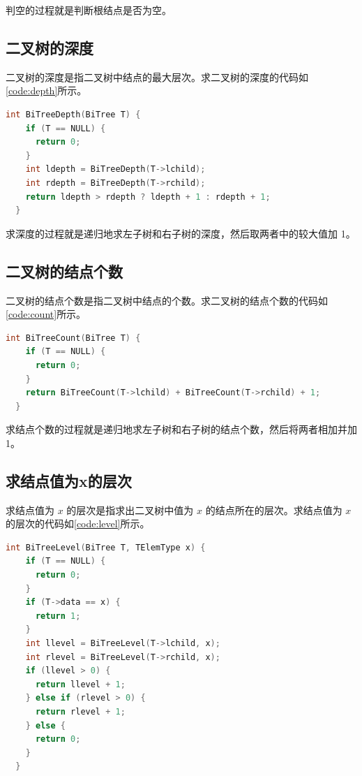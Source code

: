\documentclass[lang=cn,newtx,10pt,scheme=chinese]{../elegantbook}
\begin{document}
判空的过程就是判断根结点是否为空。

\subsection{二叉树的深度}

二叉树的深度是指二叉树中结点的最大层次。求二叉树的深度的代码如\ref{code:depth}所示。

\begin{lstlisting}[language=C++, caption={求深度}, label={code:depth}]
  int BiTreeDepth(BiTree T) {
    if (T == NULL) {
      return 0;
    }
    int ldepth = BiTreeDepth(T->lchild);
    int rdepth = BiTreeDepth(T->rchild);
    return ldepth > rdepth ? ldepth + 1 : rdepth + 1;
  }

\end{lstlisting}

求深度的过程就是递归地求左子树和右子树的深度，然后取两者中的较大值加 1。

\subsection{二叉树的结点个数}

二叉树的结点个数是指二叉树中结点的个数。求二叉树的结点个数的代码如\ref{code:count}所示。

\begin{lstlisting}[language=C++, caption={求结点个数}, label={code:count}]
  int BiTreeCount(BiTree T) {
    if (T == NULL) {
      return 0;
    }
    return BiTreeCount(T->lchild) + BiTreeCount(T->rchild) + 1;
  }

\end{lstlisting}

求结点个数的过程就是递归地求左子树和右子树的结点个数，然后将两者相加并加 1。

\subsection{求结点值为x的层次}

求结点值为 $x$ 的层次是指求出二叉树中值为 $x$ 的结点所在的层次。求结点值为 $x$ 的层次的代码如\ref{code:level}所示。

\begin{lstlisting}[language=C++, caption={求结点值为x的层次}, label={code:level}]
  int BiTreeLevel(BiTree T, TElemType x) {
    if (T == NULL) {
      return 0;
    }
    if (T->data == x) {
      return 1;
    }
    int llevel = BiTreeLevel(T->lchild, x);
    int rlevel = BiTreeLevel(T->rchild, x);
    if (llevel > 0) {
      return llevel + 1;
    } else if (rlevel > 0) {
      return rlevel + 1;
    } else {
      return 0;
    }
  }

\end{lstlisting}
\end{document}
